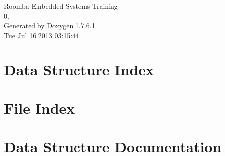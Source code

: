 \documentclass[a4paper]{book}
\begin{document}
\hypersetup{pageanchor=false,citecolor=blue}
\begin{titlepage}
\vspace*{7cm}
\begin{center}
{\Large \-Roomba \-Embedded \-Systems \-Training \\[1ex]\large 0. }\\
\vspace*{1cm}
{\large \-Generated by Doxygen 1.7.6.1}\\
\vspace*{0.5cm}
{\small Tue Jul 16 2013 03:15:44}\\
\end{center}
\end{titlepage}
\clearemptydoublepage
{}
\tableofcontents
\clearemptydoublepage
{}
\hypersetup{pageanchor=true,citecolor=blue}
\chapter{\-Data \-Structure \-Index}

\chapter{\-File \-Index}

\chapter{\-Data \-Structure \-Documentation}















\end{document}
